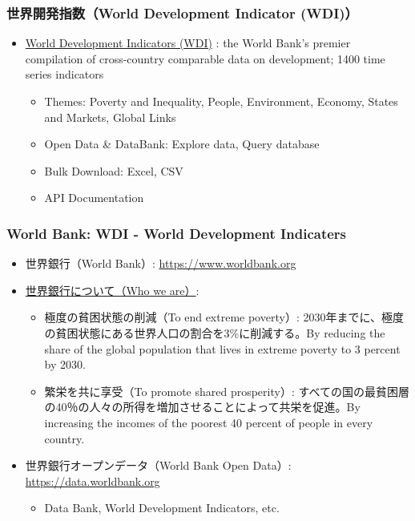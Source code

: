 \documentclass[
]{bxjsbook}
\providecommand{\tightlist}{%
  \setlength{\itemsep}{0pt}\setlength{\parskip}{0pt}}
\theoremstyle{definition}
\theoremstyle{definition}
\theoremstyle{definition}
\theoremstyle{definition}
\theoremstyle{remark}
\begin{document}
\hypertarget{ux4e16ux754cux958bux767aux6307ux6570world-development-indicator-wdi}{%
\subsubsection{世界開発指数（World Development Indicator (WDI)）}\label{ux4e16ux754cux958bux767aux6307ux6570world-development-indicator-wdi}}

\begin{itemize}
\tightlist
\item
  \href{https://datatopics.worldbank.org/world-development-indicators/}{World Development Indicators (WDI)} : the World Bank's premier compilation of cross-country comparable data on development; 1400 time series indicators

  \begin{itemize}
  \tightlist
  \item
    Themes: Poverty and Inequality, People, Environment, Economy, States and Markets, Global Links
  \item
    Open Data \& DataBank: Explore data, Query database
  \item
    Bulk Download: Excel, CSV
  \item
    API Documentation
  \end{itemize}
\end{itemize}

\hypertarget{world-bank-wdi---world-development-indicaters}{%
\subsubsection{World Bank: WDI - World Development Indicaters}\label{world-bank-wdi---world-development-indicaters}}

\begin{itemize}
\tightlist
\item
  世界銀行（World Bank）: \url{https://www.worldbank.org}
\item
  \href{https://www.worldbank.org/en/who-we-are}{世界銀行について（Who we are）}:

  \begin{itemize}
  \tightlist
  \item
    極度の貧困状態の削減（To end extreme poverty）: 2030年までに、極度の貧困状態にある世界人口の割合を3\%に削減する。By reducing the share of the global population that lives in extreme poverty to 3 percent by 2030.
  \item
    繁栄を共に享受（To promote shared prosperity）: すべての国の最貧困層の40％の人々の所得を増加させることによって共栄を促進。By increasing the incomes of the poorest 40 percent of people in every country.
  \end{itemize}
\item
  世界銀行オープンデータ（World Bank Open Data）: \url{https://data.worldbank.org}

  \begin{itemize}
  \tightlist
  \item
    Data Bank, World Development Indicators, etc.
  \end{itemize}
\end{itemize}
\end{document}
